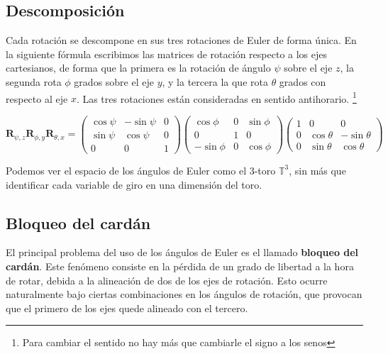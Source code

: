\documentclass{article}
\theoremstyle{plain}
\theoremstyle{definition}
\theoremstyle{remark}
\begin{document}

\subsection{Descomposición}


Cada rotación se descompone en sus tres rotaciones de Euler de forma
única.  En la siguiente fórmula escribimos las matrices de rotación
respecto a los ejes cartesianos, de forma que la primera es la
rotación de ángulo $\psi$ sobre el eje $z$, la segunda rota $\phi$
grados sobre el eje $y$, y la tercera la que rota $\theta$ grados con
respecto al eje $x$. Las tres rotaciones están consideradas en sentido
antihorario.  \footnote{Para cambiar el sentido no hay más que
  cambiarle el signo a los senos}

\[
  \mathbf{R}_{\psi,z}
  \mathbf{R}_{\phi,y}
  \mathbf{R}_{\theta,x} =
  \begin{pmatrix}
    \cos \psi & -\sin \psi & 0 \\
    \sin \psi & \cos \psi & 0 \\
    0 & 0 & 1
  \end{pmatrix}\begin{pmatrix}
      \cos \phi & 0 & \sin \phi \\
      0 & 1 & 0 \\
      -\sin \phi & 0 & \cos \phi
    \end{pmatrix}\begin{pmatrix}
    1 & 0 & 0 \\
    0 & \cos \theta & -\sin \theta \\
    0 & \sin \theta & \cos \theta
  \end{pmatrix}
\]

Podemos ver el espacio de los ángulos de Euler como el 3-toro
$\mathbb T^3$, sin más que identificar cada variable de giro en una
dimensión del toro.


\subsection{Bloqueo del cardán}

El principal problema del uso de los ángulos de Euler es el llamado
\textbf{bloqueo del cardán}. Este fenómeno consiste en la pérdida de
un grado de libertad a la hora de rotar, debida a la alineación de dos
de los ejes de rotación. Esto ocurre naturalmente bajo ciertas
combinaciones en los ángulos de rotación, que provocan que el primero
de los ejes quede alineado con el tercero.
\end{document}
